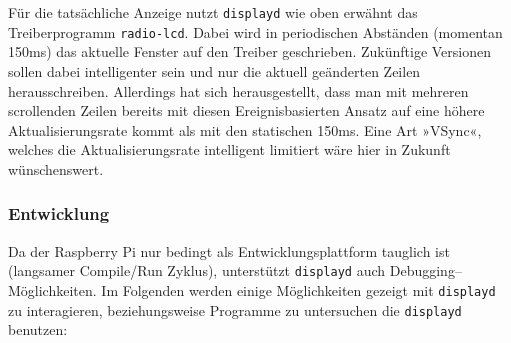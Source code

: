 \documentclass[11pt,ngerman,toc=listof,index=totoc]{scrreprt}
\newenvironment{Shaded}{}{}
\newcommand{\KeywordTok}[1]{\textcolor[rgb]{0.00,0.44,0.13}{\textbf{{#1}}}}
\newcommand{\CommentTok}[1]{\textcolor[rgb]{0.38,0.63,0.69}{\textit{{#1}}}}
\newcommand{\NormalTok}[1]{{#1}}
\begin{document}
Für die tatsächliche Anzeige nutzt \texttt{displayd} wie oben erwähnt
das Treiberprogramm \texttt{radio-lcd}. Dabei wird in periodischen
Abständen (momentan 150ms) das aktuelle Fenster auf den Treiber
geschrieben. Zukünftige Versionen sollen dabei intelligenter sein und
nur die aktuell geänderten Zeilen herausschreiben. Allerdings hat sich
herausgestellt, dass man mit mehreren scrollenden Zeilen bereits mit
diesen Ereignisbasierten Ansatz auf eine höhere Aktualisierungsrate
kommt als mit den statischen 150ms. Eine Art »VSync«, welches die
Aktualisierungsrate intelligent limitiert wäre hier in Zukunft
wünschenswert.

\subsubsection{Entwicklung}\label{entwicklung}

Da der Raspberry Pi nur bedingt als Entwicklungsplattform tauglich ist
(langsamer Compile/Run Zyklus), unterstützt \texttt{displayd} auch
Debugging--Möglichkeiten. Im Folgenden werden einige Möglichkeiten
gezeigt mit \texttt{displayd} zu interagieren, beziehungsweise Programme
zu untersuchen die \texttt{displayd} benutzen:

\begin{Shaded}
\end{Shaded}
\end{document}
